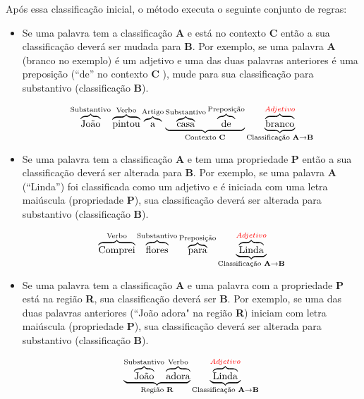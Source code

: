 Após essa classificação inicial, o método executa o seguinte conjunto de regras:

\begin{itemize}
   \item Se uma palavra tem a classificação \textbf{A} e está no contexto
  \textbf{C} então a sua classificação deverá ser mudada para \textbf{B}. Por
  exemplo, se uma palavra \textbf{A} (branco no exemplo) é um adjetivo e uma das
  duas palavras anteriores é uma preposição (``de'' no contexto \textbf{C}
  ), mude para sua classificação para substantivo (classificação \textbf{B}).
  
  \[\overbrace{\text{João}}^\text{Substantivo}
  \overbrace{\text{pintou}}^\text{Verbo}
  \overbrace{\text{a}}^\text{Artigo}
  \underbrace{
  \overbrace{\text{casa}}^\text{Substantivo}
  \overbrace{\text{de}}^\text{Preposição}}_\text{Contexto \textbf{C}}
  \underbrace{\overbrace{\text{branco}}^{\textcolor{red}{Adjetivo}}}_\text{Classificação
  \textbf{A}\textrightarrow\textbf{B}}
 \]
 
  \item Se uma palavra tem a classificação \textbf{A} e tem uma propriedade
  \textbf{P} então a sua classificação deverá ser alterada para \textbf{B}. Por
  exemplo, se uma palavra \textbf{A} (``Linda'') foi classificada como um
  adjetivo e é iniciada com uma letra maiúscula (propriedade \textbf{P}), sua
  classificação deverá ser alterada para substantivo (classificação \textbf{B}).
  
  \[\overbrace{\text{Comprei}}^\text{Verbo}
  \overbrace{\text{flores}}^\text{Substantivo}
  \overbrace{\text{para}}^\text{Preposição}
  \underbrace{\overbrace{\text{L}\text{inda}}^{\textcolor{red}{Adjetivo}}}_\text{Classificação
  \textbf{A}\textrightarrow\textbf{B}}
 \]
 
  \item Se uma palavra tem a classificação \textbf{A} e uma palavra com a
  propriedade \textbf{P} está na região \textbf{R}, sua classificação deverá
  ser \textbf{B}. Por exemplo, se uma das duas palavras anteriores (``João
  adora" na região \textbf{R}) iniciam com letra maiúscula (propriedade
  \textbf{P}), sua classificação deverá ser alterada para substantivo (classificação \textbf{B}).
  
   \[\underbrace{\overbrace{\text{João}}^\text{Substantivo}
  \overbrace{\text{adora}}^\text{Verbo}}_\text{Região \textbf{R}}
  \underbrace{\overbrace{\text{L}\text{inda}}^{\textcolor{red}{Adjetivo}}}_\text{Classificação
  \textbf{A}\textrightarrow\textbf{B}}
 \]
 
  
\end{itemize}

